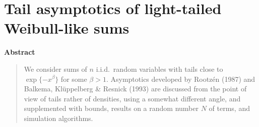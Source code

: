 \chapter{Tail asymptotics of light-tailed Weibull-like sums}

% 
% 
% 



\begin{center}
\textbf{Abstract}
\end{center}
\begin{quote}
We consider sums of $n$ i.i.d.\ random variables with tails close to $\exp\{-x^\beta\}$ for some $\beta>1$. Asymptotics  developed
by Rootz\'en (1987) and Balkema, Kl\"uppelberg \& Resnick (1993) are discussed from the point of view of tails rather of densities, using a somewhat different angle,  and supplemented with bounds, results on a random number $N$ of terms, and simulation algorithms.
\end{quote}


